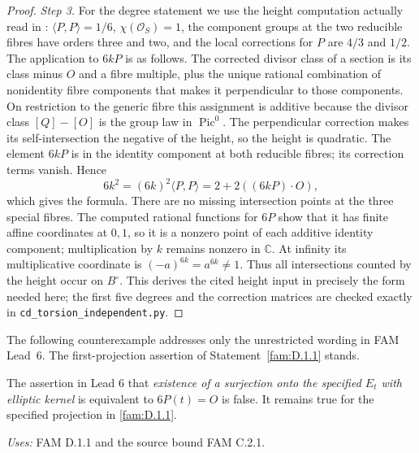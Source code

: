 \begin{proof}
\par\noindent\textit{Step 3.} For the degree statement we use the height computation actually read in
\cite[Lemma 2.1 and proof]{E26}: \(\langle P,P\rangle=1/6\),
\(\chi(\mathcal O_S)=1\), the component groups at the two reducible fibres
have orders three and two, and the local corrections for \(P\) are
\(4/3\) and \(1/2\). The application to \(6kP\) is as follows.
The corrected divisor class of a section is its class minus \(O\) and
a fibre multiple, plus the unique rational combination of nonidentity
fibre components that makes it perpendicular to those components.
On restriction to the generic fibre this assignment is additive because
the divisor class \([Q]-[O]\) is the group law in \(\operatorname{Pic}^0\).
The perpendicular correction makes its self-intersection the negative of
the height, so the height is quadratic. The element \(6kP\) is in the
identity component at both reducible fibres; its correction terms vanish.
Hence
\[
 6k^2=(6k)^2\langle P,P\rangle
 =2+2((6kP)\mathbin{\cdot}O),
\]
which gives the formula. There are no missing intersection points at the
three special fibres. The computed rational functions for \(6P\) show
that it has finite affine coordinates at \(0,1\), so it is a nonzero point
of each additive identity component; multiplication by \(k\) remains
nonzero in \(\mathbb C\). At infinity its multiplicative coordinate is
\((-a)^{6k}=a^{6k}\ne1\). Thus all intersections counted by the height
occur on \(B^\circ\). This derives the cited height input in precisely
the form needed here; the first five degrees and the correction matrices
are checked exactly in \texttt{cd\_torsion\_independent.py}.
\end{proof}

\noindent The following counterexample addresses only the unrestricted wording in FAM Lead~6. The first-projection assertion of Statement~\ref{fam:D.1.1} stands.\par
\begin{theorem}[FAM D.1.3; T]\label{fam:D.1.3}
The assertion in Lead 6 that \emph{existence of a surjection onto the
specified \(E_t\) with elliptic kernel} is equivalent to \(6P(t)=O\)
is false. It remains true for the specified projection in \ref{fam:D.1.1}.
\end{theorem}
\noindent\emph{Uses:} FAM D.1.1 and the source bound FAM C.2.1.\par

